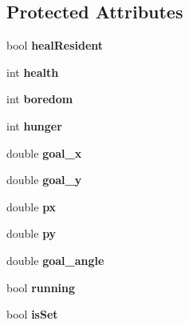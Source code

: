 \subsection*{Protected Attributes}
\begin{DoxyCompactItemize}
\item 
\hypertarget{classDoctor_adab6ec6a93ee2f58b436a8294120f295}{bool {\bfseries heal\-Resident}}\label{classDoctor_adab6ec6a93ee2f58b436a8294120f295}

\item 
\hypertarget{classDoctor_ab1814310e306e7a742ffa9c5c6b913ef}{int {\bfseries health}}\label{classDoctor_ab1814310e306e7a742ffa9c5c6b913ef}

\item 
\hypertarget{classDoctor_a76dcb7e1308ef8001b7960cb542e3824}{int {\bfseries boredom}}\label{classDoctor_a76dcb7e1308ef8001b7960cb542e3824}

\item 
\hypertarget{classDoctor_a7b59e97eb09eed2ffed797d1174ac47f}{int {\bfseries hunger}}\label{classDoctor_a7b59e97eb09eed2ffed797d1174ac47f}

\item 
\hypertarget{classDoctor_ae058c3d6dce31d71ac4e63e3fd653275}{double {\bfseries goal\-\_\-x}}\label{classDoctor_ae058c3d6dce31d71ac4e63e3fd653275}

\item 
\hypertarget{classDoctor_aba0c1163551f144834fc0d68c556fac2}{double {\bfseries goal\-\_\-y}}\label{classDoctor_aba0c1163551f144834fc0d68c556fac2}

\item 
\hypertarget{classDoctor_a6ea729b1a8fc6d33176d768ef62b0a43}{double {\bfseries px}}\label{classDoctor_a6ea729b1a8fc6d33176d768ef62b0a43}

\item 
\hypertarget{classDoctor_a04b4b5bddd2b99b6eb4b7b8813eeeebf}{double {\bfseries py}}\label{classDoctor_a04b4b5bddd2b99b6eb4b7b8813eeeebf}

\item 
\hypertarget{classDoctor_a27377808d49670322af2ce4ec34730f1}{double {\bfseries goal\-\_\-angle}}\label{classDoctor_a27377808d49670322af2ce4ec34730f1}

\item 
\hypertarget{classDoctor_a2f7dffac0f8141914640e8f9bee5e7ff}{bool {\bfseries running}}\label{classDoctor_a2f7dffac0f8141914640e8f9bee5e7ff}

\item 
\hypertarget{classDoctor_ae31c0df1faec161bc8fec8dfae55b139}{bool {\bfseries is\-Set}}\label{classDoctor_ae31c0df1faec161bc8fec8dfae55b139}


\end{DoxyCompactItemize}
